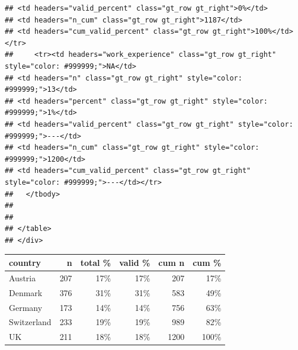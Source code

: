 \documentclass[
  a4paper,
  DIV=11,
  numbers=noendperiod]{scrartcl}
\begin{document}
\begin{verbatim}
## <td headers="valid_percent" class="gt_row gt_right">0%</td>
## <td headers="n_cum" class="gt_row gt_right">1187</td>
## <td headers="cum_valid_percent" class="gt_row gt_right">100%</td></tr>
##     <tr><td headers="work_experience" class="gt_row gt_right" style="color: #999999;">NA</td>
## <td headers="n" class="gt_row gt_right" style="color: #999999;">13</td>
## <td headers="percent" class="gt_row gt_right" style="color: #999999;">1%</td>
## <td headers="valid_percent" class="gt_row gt_right" style="color: #999999;">---</td>
## <td headers="n_cum" class="gt_row gt_right" style="color: #999999;">1200</td>
## <td headers="cum_valid_percent" class="gt_row gt_right" style="color: #999999;">---</td></tr>
##   </tbody>
##   
##   
## </table>
## </div>
\end{verbatim}

\begin{table}
\fontsize{13.5pt}{16.2pt}\selectfont
\begin{tabular*}{\linewidth}{@{\extracolsep{\fill}}lrrrrr}
\toprule
country & n & total \% & valid \% & cum n & cum \% \\ 
\midrule\addlinespace[2.5pt]
Austria & 207 & 17\% & 17\% & 207 & 17\% \\ 
Denmark & 376 & 31\% & 31\% & 583 & 49\% \\ 
Germany & 173 & 14\% & 14\% & 756 & 63\% \\ 
Switzerland & 233 & 19\% & 19\% & 989 & 82\% \\ 
UK & 211 & 18\% & 18\% & 1200 & 100\% \\ 
\bottomrule
\end{tabular*}
\end{table}
\end{document}

